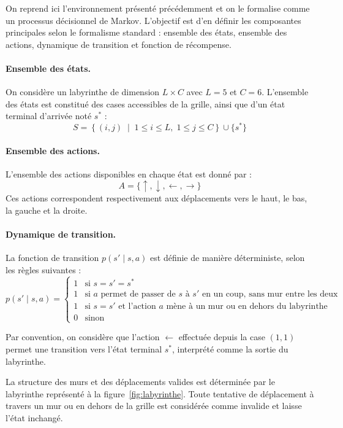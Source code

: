 \documentclass[12pt]{article}
\begin{document}
On reprend ici l’environnement présenté précédemment et on le formalise comme un processus décisionnel de Markov. L’objectif est d’en définir les composantes principales selon le formalisme standard : ensemble des états, ensemble des actions, dynamique de transition et fonction de récompense.

\paragraph{Ensemble des états.}
On considère un labyrinthe de dimension $L \times C$ avec $L = 5$ et $C = 6$. L’ensemble des états est constitué des cases accessibles de la grille, ainsi que d’un état terminal d’arrivée noté $s^*$ :
\[
S = \left\{ (i,j) \;\middle|\; 1 \leq i \leq L,\; 1 \leq j \leq C \right\} \cup \{s^*\}
\]

\paragraph{Ensemble des actions.}
L’ensemble des actions disponibles en chaque état est donné par :
\[
A = \{\uparrow, \downarrow, \leftarrow, \rightarrow\}
\]
Ces actions correspondent respectivement aux déplacements vers le haut, le bas, la gauche et la droite.

\paragraph{Dynamique de transition.}
La fonction de transition $p(s' \mid s, a)$ est définie de manière déterministe, selon les règles suivantes :
\[
p(s' \mid s, a) =
\begin{cases}
1 & \text{si } s = s' = s^* \\
1 & \text{si } a \text{ permet de passer de } s \text{ à } s' \text{ en un coup, sans mur entre les deux} \\
1 & \text{si } s = s' \text{ et l'action } a \text{ mène à un mur ou en dehors du labyrinthe} \\
0 & \text{sinon}
\end{cases}
\]

Par convention, on considère que l’action \(\leftarrow\) effectuée depuis la case \((1,1)\) permet une transition vers l’état terminal \(s^*\), interprété comme la sortie du labyrinthe.

La structure des murs et des déplacements valides est déterminée par le labyrinthe représenté à la figure~\ref{fig:labyrinthe}. Toute tentative de déplacement à travers un mur ou en dehors de la grille est considérée comme invalide et laisse l’état inchangé.
\end{document}
